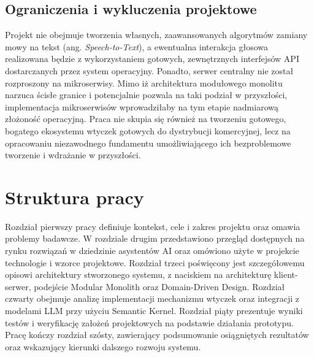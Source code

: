 \subsection{Ograniczenia i wykluczenia projektowe}
\label{subsec:ograniczenia}
Projekt nie obejmuje tworzenia własnych, zaawansowanych algorytmów zamiany mowy na tekst (ang. \textit{Speech-to-Text}), a ewentualna interakcja głosowa realizowana będzie z wykorzystaniem gotowych, zewnętrznych interfejsów API dostarczanych przez system operacyjny. Ponadto, serwer centralny nie został rozproszony na mikroserwisy. Mimo iż architektura modułowego monolitu narzuca ścisłe granice i potencjalnie pozwala na taki podział w przyszłości, implementacja mikroserwisów wprowadziłaby na tym etapie nadmiarową złożoność operacyjną. Praca nie skupia się również na tworzeniu gotowego, bogatego ekosystemu wtyczek gotowych do dystrybucji komercyjnej, lecz na opracowaniu niezawodnego fundamentu umożliwiającego ich bezproblemowe tworzenie i wdrażanie w przyszłości.

\section{Struktura pracy}
\label{sec:struktura}
Rozdział pierwszy pracy definiuje kontekst, cele i zakres projektu oraz omawia problemy badawcze. W rozdziale drugim przedstawiono przegląd dostępnych na rynku rozwiązań w dziedzinie asystentów AI oraz omówiono użyte w projekcie technologie i wzorce projektowe. Rozdział trzeci poświęcony jest szczegółowemu opisowi architektury stworzonego systemu, z naciskiem na architekturę klient-serwer, podejście Modular Monolith oraz Domain-Driven Design. Rozdział czwarty obejmuje analizę implementacji mechanizmu wtyczek oraz integracji z modelami LLM przy użyciu Semantic Kernel. Rozdział piąty prezentuje wyniki testów i weryfikację założeń projektowych na podstawie działania prototypu. Pracę kończy rozdział szósty, zawierający podsumowanie osiągniętych rezultatów oraz wskazujący kierunki dalszego rozwoju systemu.

